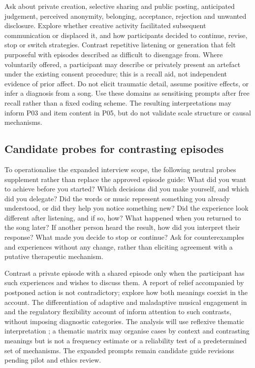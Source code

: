 Ask about private creation, selective sharing and public posting, anticipated judgement, perceived anonymity, belonging, acceptance, rejection and unwanted disclosure. Explore whether creative activity facilitated subsequent communication or displaced it, and how participants decided to continue, revise, stop or switch strategies. Contrast repetitive listening or generation that felt purposeful with episodes described as difficult to disengage from. Where voluntarily offered, a participant may describe or privately present an artefact under the existing consent procedure; this is a recall aid, not independent evidence of prior affect. Do not elicit traumatic detail, assume positive effects, or infer a diagnosis from a song. Use these domains as sensitising prompts after free recall rather than a fixed coding scheme. The resulting interpretations may inform P03 and item content in P05, but do not validate scale structure or causal mechanisms.

\subsection{Candidate probes for contrasting episodes}
To operationalise the expanded interview scope, the following neutral probes supplement rather than replace the approved episode guide: What did you want to achieve before you started? Which decisions did you make yourself, and which did you delegate? Did the words or music represent something you already understood, or did they help you notice something new? Did the experience look different after listening, and if so, how? What happened when you returned to the song later? If another person heard the result, how did you interpret their response? What made you decide to stop or continue? Ask for counterexamples and experiences without any change, rather than eliciting agreement with a putative therapeutic mechanism.

Contrast a private episode with a shared episode only when the participant has such experiences and wishes to discuss them. A report of relief accompanied by postponed action is not contradictory; explore how both meanings coexist in the account. The differentiation of adaptive and maladaptive musical engagement in \citet{carlson2015} and the regulatory flexibility account of \citet{bonanno2013} inform attention to such contrasts, without imposing diagnostic categories. The analysis will use reflexive thematic interpretation \citep{braun2021}; a thematic matrix may organise cases by context and contrasting meanings but is not a frequency estimate or a reliability test of a predetermined set of mechanisms. The expanded prompts remain candidate guide revisions pending pilot and ethics review.

